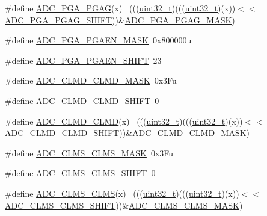 \begin{DoxyCompactItemize}
\#define \hyperlink{group___a_d_c___register___masks_ga1d4942de079b809f824f89c6b3ac2be1}{A\+D\+C\+\_\+\+P\+G\+A\+\_\+\+P\+G\+AG}(x)                                                ~(((\hyperlink{_p_e___types_8h_a33594304e786b158f3fb30289278f5af}{uint32\+\_\+t})(((\hyperlink{_p_e___types_8h_a33594304e786b158f3fb30289278f5af}{uint32\+\_\+t})(x))$<$$<$\hyperlink{group___a_d_c___register___masks_gaa0979a2ccd896d245b77f053076cf2c6}{A\+D\+C\+\_\+\+P\+G\+A\+\_\+\+P\+G\+A\+G\+\_\+\+S\+H\+I\+FT}))\&\hyperlink{group___a_d_c___register___masks_ga55a340c6fac33dc33fa72db68c8a6576}{A\+D\+C\+\_\+\+P\+G\+A\+\_\+\+P\+G\+A\+G\+\_\+\+M\+A\+SK})
\item 
\#define \hyperlink{group___a_d_c___register___masks_ga43041669f7d4bc8d046ed58fd9074e2b}{A\+D\+C\+\_\+\+P\+G\+A\+\_\+\+P\+G\+A\+E\+N\+\_\+\+M\+A\+SK}~0x800000u
\item 
\#define \hyperlink{group___a_d_c___register___masks_gaef8ffbfc9f36f616ad9e05418c5fa5bd}{A\+D\+C\+\_\+\+P\+G\+A\+\_\+\+P\+G\+A\+E\+N\+\_\+\+S\+H\+I\+FT}~23
\item 
\#define \hyperlink{group___a_d_c___register___masks_ga45c4117ad9fba213c3d338cf6280cb75}{A\+D\+C\+\_\+\+C\+L\+M\+D\+\_\+\+C\+L\+M\+D\+\_\+\+M\+A\+SK}~0x3\+Fu
\item 
\#define \hyperlink{group___a_d_c___register___masks_ga872bf108b50c6dd439ddc1294f104fe5}{A\+D\+C\+\_\+\+C\+L\+M\+D\+\_\+\+C\+L\+M\+D\+\_\+\+S\+H\+I\+FT}~0
\item 
\#define \hyperlink{group___a_d_c___register___masks_gada01491a34a2a912a7cdbccac2134da4}{A\+D\+C\+\_\+\+C\+L\+M\+D\+\_\+\+C\+L\+MD}(x)                                              ~(((\hyperlink{_p_e___types_8h_a33594304e786b158f3fb30289278f5af}{uint32\+\_\+t})(((\hyperlink{_p_e___types_8h_a33594304e786b158f3fb30289278f5af}{uint32\+\_\+t})(x))$<$$<$\hyperlink{group___a_d_c___register___masks_ga872bf108b50c6dd439ddc1294f104fe5}{A\+D\+C\+\_\+\+C\+L\+M\+D\+\_\+\+C\+L\+M\+D\+\_\+\+S\+H\+I\+FT}))\&\hyperlink{group___a_d_c___register___masks_ga45c4117ad9fba213c3d338cf6280cb75}{A\+D\+C\+\_\+\+C\+L\+M\+D\+\_\+\+C\+L\+M\+D\+\_\+\+M\+A\+SK})
\item 
\#define \hyperlink{group___a_d_c___register___masks_ga108adc09b24001dddfd498e14213fea6}{A\+D\+C\+\_\+\+C\+L\+M\+S\+\_\+\+C\+L\+M\+S\+\_\+\+M\+A\+SK}~0x3\+Fu
\item 
\#define \hyperlink{group___a_d_c___register___masks_gabe0e92adb89c86d0523958a947288808}{A\+D\+C\+\_\+\+C\+L\+M\+S\+\_\+\+C\+L\+M\+S\+\_\+\+S\+H\+I\+FT}~0
\item 
\#define \hyperlink{group___a_d_c___register___masks_ga08f7411075a5d5ba22c96f5f9027f580}{A\+D\+C\+\_\+\+C\+L\+M\+S\+\_\+\+C\+L\+MS}(x)                                              ~(((\hyperlink{_p_e___types_8h_a33594304e786b158f3fb30289278f5af}{uint32\+\_\+t})(((\hyperlink{_p_e___types_8h_a33594304e786b158f3fb30289278f5af}{uint32\+\_\+t})(x))$<$$<$\hyperlink{group___a_d_c___register___masks_gabe0e92adb89c86d0523958a947288808}{A\+D\+C\+\_\+\+C\+L\+M\+S\+\_\+\+C\+L\+M\+S\+\_\+\+S\+H\+I\+FT}))\&\hyperlink{group___a_d_c___register___masks_ga108adc09b24001dddfd498e14213fea6}{A\+D\+C\+\_\+\+C\+L\+M\+S\+\_\+\+C\+L\+M\+S\+\_\+\+M\+A\+SK})
$$
\end{DoxyCompactItemize}
